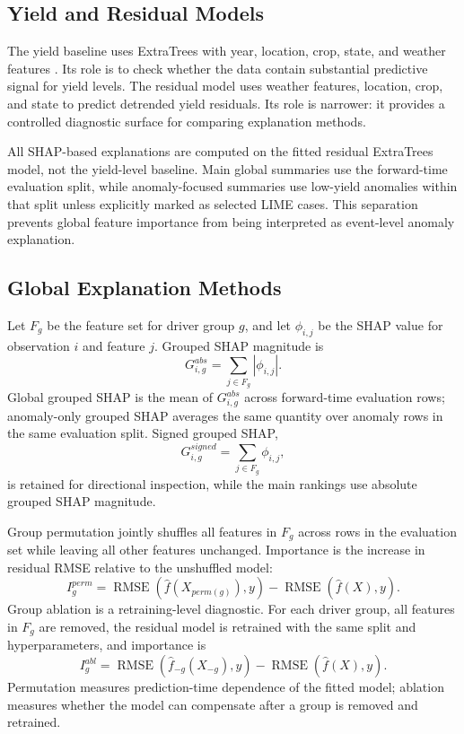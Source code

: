 \documentclass[11pt]{article}
\begin{document}
\subsection{Yield and Residual Models}
The yield baseline uses ExtraTrees with year, location, crop, state, and weather
features \citep{Geurts2006,Pedregosa2011}. Its role is to check whether the data
contain substantial predictive signal for yield levels. The residual model uses
weather features, location, crop, and state to predict detrended yield residuals. Its
role is narrower: it provides a controlled diagnostic surface for comparing
explanation methods.

All SHAP-based explanations are computed on the fitted residual ExtraTrees model,
not the yield-level baseline. Main global summaries use the forward-time evaluation
split, while anomaly-focused summaries use low-yield anomalies within that split
unless explicitly marked as selected LIME cases. This separation prevents global
feature importance from being interpreted as event-level anomaly explanation.



\subsection{Global Explanation Methods}
Let $F_g$ be the feature set for driver group $g$, and let $\phi_{i,j}$ be the SHAP
value for observation $i$ and feature $j$. Grouped SHAP magnitude is
\begin{equation}
  G_{i,g}^{abs} = \sum_{j \in F_g} |\phi_{i,j}|.
\end{equation}
Global grouped SHAP is the mean of $G_{i,g}^{abs}$ across forward-time evaluation
rows; anomaly-only grouped SHAP averages the same quantity over anomaly rows in the
same evaluation split. Signed grouped SHAP,
\begin{equation}
  G_{i,g}^{signed} = \sum_{j \in F_g} \phi_{i,j},
\end{equation}
is retained for directional inspection, while the main rankings use absolute
grouped SHAP magnitude.

Group permutation jointly shuffles all features in $F_g$ across rows in the
evaluation set while leaving all other features unchanged. Importance is the
increase in residual RMSE relative to the unshuffled model:
\begin{equation}
  I_g^{perm} = \operatorname{RMSE}(\hat{f}(X_{perm(g)}), y)
  - \operatorname{RMSE}(\hat{f}(X), y).
\end{equation}
Group ablation is a retraining-level diagnostic. For each driver group, all features
in $F_g$ are removed, the residual model is retrained with the same split and
hyperparameters, and importance is
\begin{equation}
  I_g^{abl} = \operatorname{RMSE}(\hat{f}_{-g}(X_{-g}), y)
  - \operatorname{RMSE}(\hat{f}(X), y).
\end{equation}
Permutation measures prediction-time dependence of the fitted model; ablation
measures whether the model can compensate after a group is removed and retrained.
\end{document}
